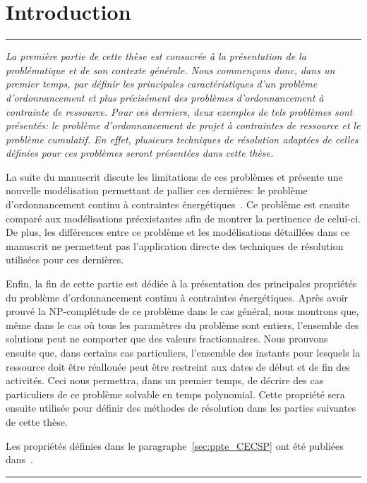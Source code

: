 \cleardoublepage
\begin{minipage}{0.95\linewidth}
  \part{Introduction}
  \vspace{15mm} %
  \parttoc 

\end{minipage}

\newpage
\thispagestyle{empty}
\begin{center}
  \begin{minipage}{\textwidth}
    \hrule
    \vspace{0.5cm}
    {\it  La première partie de cette thèse est consacrée à la présentation de
    la problématique et de son contexte générale. Nous commençons donc,
    dans un premier temps, par définir les principales caractéristiques
    d'un problème d'ordonnancement et plus précisément des problèmes
    d'ordonnancement à contrainte de ressource. Pour ces derniers,
    deux exemples de tels problèmes sont présentés: le problème
    d'ordonnancement de projet à contraintes de ressource et le
    problème cumulatif. En effet, plusieurs techniques de résolution
    adaptées de celles définies pour ces problèmes seront présentées
    dans cette thèse. 

    La suite du manuscrit discute les limitations de ces problèmes
    et présente une nouvelle modélisation permettant de pallier ces
    dernières: le problème d'ordonnancement continu à contraintes
    énergétiques~\cite{ArtiguesLopez,Nattaf_ORSpectrum,Nattaf_Constraints}. Ce
    problème est ensuite comparé aux modélisations préexistantes afin de
    montrer la pertinence de celui-ci. De plus, les différences entre ce
    problème et les modélisations détaillées dans ce manuscrit ne
    permettent pas l'application directe des techniques de résolution
    utilisées pour ces dernières.

    Enfin, la fin de cette partie est dédiée à la présentation des
    principales propriétés du problème d'ordonnancement continu à
    contraintes énergétiques. Après avoir prouvé la NP-complétude de ce
    problème dans le cas général, nous montrons que, même dans le cas où
    tous les paramètres du problème sont entiers, l'ensemble des solutions
    peut ne comporter que des valeurs fractionnaires. Nous prouvons
    ensuite que, dans certains cas particuliers, l'ensemble des instants
    pour lesquels la ressource doit être réallouée peut être
    restreint aux dates de début et de fin des activités. Ceci nous
    permettra, dans un premier temps, de décrire des cas particuliers
    de ce problème solvable en temps polynomial. Cette propriété sera
    ensuite utilisée pour définir des méthodes de résolution dans les
    parties suivantes de cette thèse. 

    Les propriétés définies dans le paragraphe~\ref{sec:ppte_CECSP}
    ont été publiées
    dans~\cite{Nattaf_ORSpectrum,Nattaf_Constraints,Nattaf_CPDP}.} 
    \vspace{0.5cm}
    \hrule
  \end{minipage}
\end{center}
